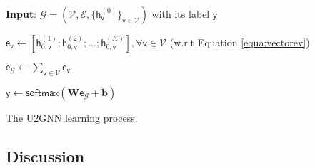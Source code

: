 \documentclass[twoside,leqno,twocolumn]{article}
\begin{document}
\begin{algorithm}
\DontPrintSemicolon
\SetAlgoVlined

\textbf{Input}: $\mathcal{G} = \left(\mathcal{V}, \mathcal{E}, \{\boldsymbol{\mathsf{h}}_{\mathsf{v}}^{(0)}\}_{\mathsf{v} \in \mathcal{V}}\right)$ with its label $\mathsf{y}$


$\boldsymbol{\mathsf{e}}_\mathsf{v} \leftarrow \left[\boldsymbol{\mathsf{h}}^{(1)}_{0,\mathsf{v}}; \boldsymbol{\mathsf{h}}^{(2)}_{0,\mathsf{v}}; ...; \boldsymbol{\mathsf{h}}^{(K)}_{0,\mathsf{v}}\right] , \forall \mathsf{v} \in \mathcal{V}$ (w.r.t Equation \ref{equa:vectorev})

$\boldsymbol{\mathsf{e}}_{\mathcal{G}} \leftarrow \sum_{\mathsf{v} \in \mathcal{V}}\boldsymbol{\mathsf{e}}_{\mathsf{v}}$

$\mathsf{y} \leftarrow \mathsf{softmax}\left(\textbf{W}\boldsymbol{\mathsf{e}}_{\mathcal{G}} + \textbf{b}\right)$

\caption{The U2GNN learning process.}
\label{alg:U2GNNsup}
\end{algorithm}


\subsection{Discussion} 
\label{subsec:discussion}
\end{document}
